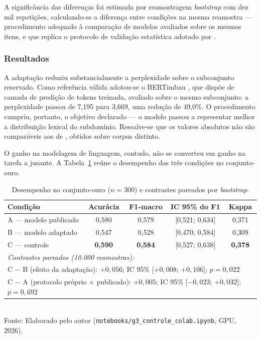 A significância das diferenças foi estimada por reamostragem \textit{bootstrap}
\cite{efron_bootstrap_1992} com dez mil repetições, calculando-se a diferença entre condições na
mesma reamostra --- procedimento adequado à comparação de modelos avaliados sobre os mesmos itens,
e que replica o protocolo de validação estatística adotado por .

\subsubsection{Resultados}

A adaptação reduziu substancialmente a perplexidade sobre o subconjunto reservado. Como referência
válida adotou-se o BERTimbau \cite{souza_bertimbau_2020}, que dispõe de camada de predição de
tokens treinada, avaliado sobre o mesmo subconjunto: a perplexidade passou de 7,195 para 3,669, uma
redução de 49,0\%. O procedimento cumpriu, portanto, o objetivo declarado --- o modelo passou a
representar melhor a distribuição lexical do subdomínio. Ressalve-se que os valores absolutos não
são comparáveis aos de , obtidos sobre corpus distinto.

O ganho na modelagem de linguagem, contudo, não se converteu em ganho na tarefa a jusante. A
Tabela~\ref{tab:resultado_adaptacao} reúne o desempenho das três condições no conjunto-ouro.

\begin{table}[htpb]
\centering
\caption{Desempenho no conjunto-ouro ($n = 300$) e contrastes pareados por \textit{bootstrap}.}
\label{tab:resultado_adaptacao}
\begin{tabular}{l c c c c}
\hline
\textbf{Condição} & \textbf{Acurácia} & \textbf{F1-macro} & \textbf{IC 95\% do F1} & \textbf{Kappa} \\ \hline
A --- modelo publicado & 0,580 & 0,579 & [0,521; 0,634] & 0,371 \\
B --- modelo adaptado  & 0,547 & 0,528 & [0,470; 0,584] & 0,309 \\
C --- controle         & \textbf{0,590} & \textbf{0,584} & [0,527; 0,638] & \textbf{0,378} \\ \hline
\multicolumn{5}{l}{\textit{Contrastes pareados (10.000 reamostras):}} \\
\multicolumn{5}{l}{C $-$ B (efeito da adaptação): $+0{,}056$; IC 95\% [$+0{,}008$; $+0{,}106$]; $p = 0{,}022$} \\
\multicolumn{5}{l}{C $-$ A (protocolo próprio $\times$ publicado): $+0{,}005$; IC 95\% [$-0{,}023$; $+0{,}032$]; $p = 0{,}692$} \\ \hline
\end{tabular}
\vspace{0.2cm}
{\small \\ Fonte: Elaborado pelo autor (\texttt{notebooks/g3\_controle\_colab.ipynb}, GPU, 2026).}
\end{table}

